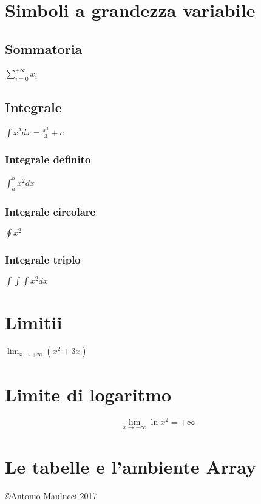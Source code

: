 \documentclass[a4paper]{article}
\begin{document}
\section{Simboli a grandezza variabile}

\subsection{Sommatoria}

$
\sum_{i=0}^{+\infty} x_i
$

\subsection{Integrale}

$
\int x^2 dx = \frac{x^3}{3} + c
$

\subsubsection{Integrale definito}
$
\int_a^b x^2 dx
$

\subsubsection{Integrale circolare}
$
\oint x^2
$

\subsubsection{Integrale triplo}
$ \int \!\!\!\! \int \!\!\!\! \int x^2 dx $


\section{Limitii}

$
\lim_{x \rightarrow +\infty} (x^2+3x)
$

\section{Limite di logaritmo}

$$
\lim_{x \rightarrow +\infty} \ln x^2 = +\infty
$$

\section{Le tabelle e l'ambiente Array}



\vspace{6cm}
\begin{center}
\copyright Antonio Maulucci 2017
\end{center}
\end{document}
